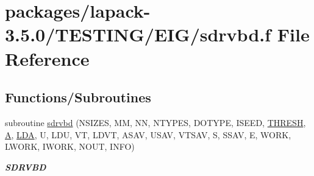 \hypertarget{sdrvbd_8f}{}\section{packages/lapack-\/3.5.0/\+T\+E\+S\+T\+I\+N\+G/\+E\+I\+G/sdrvbd.f File Reference}
\label{sdrvbd_8f}
\subsection*{Functions/\+Subroutines}
\begin{DoxyCompactItemize}
\item 
subroutine \hyperlink{group__single__eig_ga7a1566f98bf91396ed2fd1e2c70865eb}{sdrvbd} (N\+S\+I\+Z\+E\+S, M\+M, N\+N, N\+T\+Y\+P\+E\+S, D\+O\+T\+Y\+P\+E, I\+S\+E\+E\+D, \hyperlink{zlaqgs_8c_a0656018abfc9fa2821827415f5d5ea57}{T\+H\+R\+E\+S\+H}, \hyperlink{classA}{A}, \hyperlink{example__user_8c_ae946da542ce0db94dced19b2ecefd1aa}{L\+D\+A}, U, L\+D\+U, V\+T, L\+D\+V\+T, A\+S\+A\+V, U\+S\+A\+V, V\+T\+S\+A\+V, S, S\+S\+A\+V, E, W\+O\+R\+K, L\+W\+O\+R\+K, I\+W\+O\+R\+K, N\+O\+U\+T, I\+N\+F\+O)
\begin{DoxyCompactList}\small\item\em {\bfseries S\+D\+R\+V\+B\+D} \end{DoxyCompactList}\end{DoxyCompactItemize}
